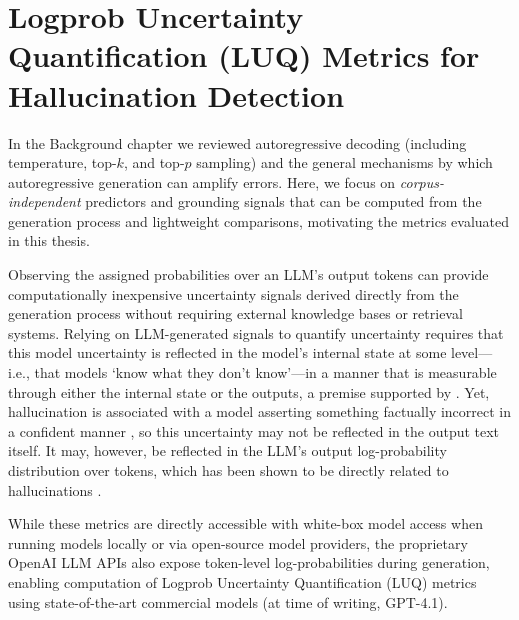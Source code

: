 
\section{Logprob Uncertainty Quantification (LUQ) Metrics for Hallucination Detection}
\label{sec:lit_luq_metrics}
\label{sec:lit_rq2_signals}

In the Background chapter we reviewed autoregressive decoding (including temperature, top-$k$, and top-$p$ sampling) and the general mechanisms by which autoregressive generation can amplify errors. Here, we focus on \emph{corpus-independent} predictors and grounding signals that can be computed from the generation process and lightweight comparisons, motivating the metrics evaluated in this thesis.

Observing the assigned probabilities over an LLM's output tokens can provide computationally inexpensive uncertainty signals derived directly from the generation process without requiring external knowledge bases or retrieval systems. 
Relying on LLM-generated signals to quantify uncertainty requires that this model uncertainty is reflected in the model's internal state at some level---i.e., that models `know what they don't know'---in a manner that is measurable through either the internal state or the outputs, a premise supported by \citet{kadavath2022language}. Yet, hallucination is associated with a model asserting something factually incorrect in a confident manner \citep{xiao-wang-2021-hallucination}, so this uncertainty may not be reflected in the output text itself.
It may, however, be reflected in the LLM's output log-probability distribution over tokens, which has been shown to be directly related to hallucinations \citep{varshney2023stitch, sriramanan2024llmcheck}.

While these metrics are directly accessible with white-box model access when running models locally or via open-source model providers, the proprietary OpenAI LLM APIs also expose token-level log-probabilities during generation, enabling computation of Logprob Uncertainty Quantification (LUQ) metrics using state-of-the-art commercial models (at time of writing, GPT-4.1). 

